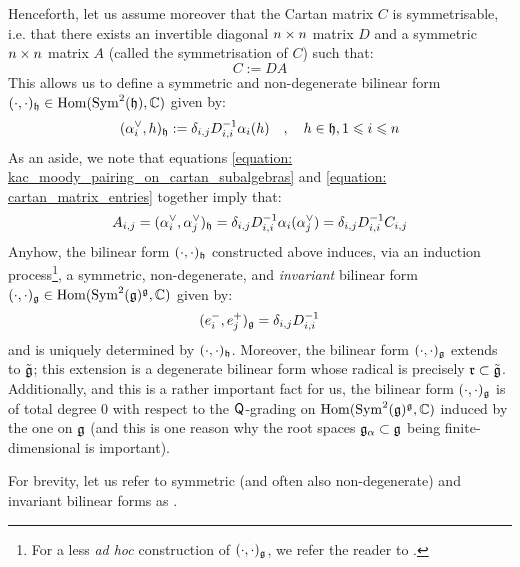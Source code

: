 Henceforth, let us assume moreover that the Cartan matrix $C$ is symmetrisable, i.e. that there exists an invertible diagonal $n \x n$ matrix $D$ and a symmetric $n \x n$ matrix $A$ (called the symmetrisation of $C$) such that:
    \begin{equation} \label{equation: symmetrising_cartan_matrices}
        C := DA
    \end{equation}
This allows us to define a symmetric and non-degenerate bilinear form $(\cdot, \cdot)_{\mathfrak{h}} \in \operatorname{Hom}( \operatorname{Sym}^2(\mathfrak{h}), \mathbb{C} )$ given by:
    \begin{equation} \label{equation: kac_moody_pairing_on_cartan_subalgebras}
        ( \alpha_i^{\vee}, h )_{\mathfrak{h}} := \delta_{i, j} D_{i, i}^{-1} \alpha_i(h) \quad, \quad h \in \mathfrak{h}, 1 \leqslant i \leqslant n
    \end{equation}
As an aside, we note that equations \eqref{equation: kac_moody_pairing_on_cartan_subalgebras} and \eqref{equation: cartan_matrix_entries} together imply that:
    $$A_{i, j} = (\alpha_i^{\vee}, \alpha_j^{\vee})_{\mathfrak{h}} = \delta_{i, j} D_{i, i}^{-1} \alpha_i( \alpha_j^{\vee} ) = \delta_{i, j} D_{i, i}^{-1} C_{i, j}$$
Anyhow, the bilinear form $(\cdot, \cdot)_{\mathfrak{h}}$ constructed above induces, via an induction process\footnote{For a less \textit{ad hoc} construction of $(\cdot, \cdot)_{\mathfrak{g}}$, we refer the reader to \cite{neher_pianzola_prelat_sepp_invariant_bilinear_forms_via_fppf_descent}.}, a symmetric, non-degenerate, and \textit{invariant} bilinear form $(\cdot, \cdot)_{\mathfrak{g}} \in \operatorname{Hom}( \operatorname{Sym}^2(\mathfrak{g})^{\mathfrak{g}}, \mathbb{C} )$ given by:
    \begin{equation} \label{equation: kac_moody_pairing}
        ( e_i^-, e_j^+ )_{\mathfrak{g}} = \delta_{i, j} D_{i, i}^{-1}
    \end{equation}
and is uniquely determined by $(\cdot, \cdot)_{\mathfrak{h}}$. Moreover, the bilinear form $(\cdot, \cdot)_{\mathfrak{g}}$ extends to $\tilde{\mathfrak{g}}$; this extension is a degenerate bilinear form whose radical is precisely $\mathfrak{r} \subset \tilde{\mathfrak{g}}$. Additionally, and this is a rather important fact for us, the bilinear form $(\cdot, \cdot)_{\mathfrak{g}}$ is of total degree $0$ with respect to the $\mathsf{Q}$-grading on $\operatorname{Hom}( \operatorname{Sym}^2(\mathfrak{g})^{\mathfrak{g}}, \mathbb{C} )$ induced by the one on $\mathfrak{g}$ (and this is one reason why the root spaces $\mathfrak{g}_{\alpha} \subset \mathfrak{g}$ being finite-dimensional is important).
\begin{convention}
    For brevity, let us refer to symmetric (and often also non-degenerate) and invariant bilinear forms as .
\end{convention}